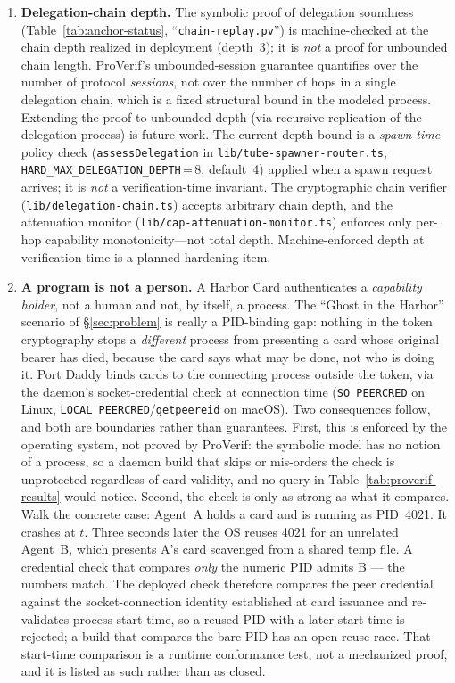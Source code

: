 \documentclass[11pt,a4paper]{article}
\theoremstyle{definition}
\begin{document}
\begin{enumerate}
  \item \textbf{Delegation-chain depth.} The symbolic proof of delegation soundness (Table~\ref{tab:anchor-status}, ``\texttt{chain-replay.pv}'') is machine-checked at the chain depth realized in deployment (depth~3); it is \emph{not} a proof for unbounded chain length. ProVerif's unbounded-session guarantee quantifies over the number of protocol \emph{sessions}, not over the number of hops in a single delegation chain, which is a fixed structural bound in the modeled process. Extending the proof to unbounded depth (via recursive replication of the delegation process) is future work. The current depth bound is a \emph{spawn-time} policy check (\texttt{assessDelegation} in \texttt{lib/tube-spawner-router.ts}, \texttt{HARD\_MAX\_DELEGATION\_DEPTH}\,=\,8, default~4) applied when a spawn request arrives; it is \emph{not} a verification-time invariant. The cryptographic chain verifier (\texttt{lib/delegation-chain.ts}) accepts arbitrary chain depth, and the attenuation monitor (\texttt{lib/cap-attenuation-monitor.ts}) enforces only per-hop capability monotonicity---not total depth. Machine-enforced depth at verification time is a planned hardening item.
  \item \textbf{A program is not a person.} A Harbor Card authenticates a \emph{capability holder}, not a human and not, by itself, a process. The ``Ghost in the Harbor'' scenario of \S\ref{sec:problem} is really a PID-binding gap: nothing in the token cryptography stops a \emph{different} process from presenting a card whose original bearer has died, because the card says what may be done, not who is doing it. Port Daddy binds cards to the connecting process outside the token, via the daemon's socket-credential check at connection time (\texttt{SO\_PEERCRED} on Linux, \texttt{LOCAL\_PEERCRED}/\texttt{getpeereid} on macOS). Two consequences follow, and both are boundaries rather than guarantees. First, this is enforced by the operating system, not proved by ProVerif: the symbolic model has no notion of a process, so a daemon build that skips or mis-orders the check is unprotected regardless of card validity, and no query in Table~\ref{tab:proverif-results} would notice. Second, the check is only as strong as what it compares. Walk the concrete case: Agent~A holds a card and is running as PID~4021. It crashes at $t$. Three seconds later the OS reuses 4021 for an unrelated Agent~B, which presents A's card scavenged from a shared temp file. A credential check that compares \emph{only} the numeric PID admits B --- the numbers match. The deployed check therefore compares the peer credential against the socket-connection identity established at card issuance and re-validates process start-time, so a reused PID with a later start-time is rejected; a build that compares the bare PID has an open reuse race. That start-time comparison is a runtime conformance test, not a mechanized proof, and it is listed as such rather than as closed.

\end{enumerate}
\end{document}
